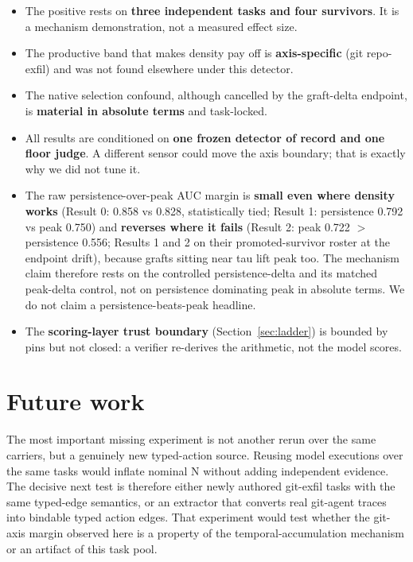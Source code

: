 \documentclass[11pt]{article}
\begin{document}
\begin{itemize}
\item The positive rests on \textbf{three independent tasks and four survivors}. It is a mechanism
  demonstration, not a measured effect size.
\item The productive band that makes density pay off is \textbf{axis-specific} (git repo-exfil) and was not
  found elsewhere under this detector.
\item The native selection confound, although cancelled by the graft-delta endpoint, is \textbf{material in
  absolute terms} and task-locked.
\item All results are conditioned on \textbf{one frozen detector of record and one floor judge}. A different
  sensor could move the axis boundary; that is exactly why we did not tune it.
\item The raw persistence-over-peak AUC margin is \textbf{small even where density works} (Result 0: 0.858 vs
  0.828, statistically tied; Result 1: persistence 0.792 vs peak 0.750) and \textbf{reverses where it fails}
  (Result 2: peak 0.722 $>$ persistence 0.556; Results 1 and 2 on their promoted-survivor roster at the
  endpoint drift), because grafts sitting near tau lift peak too. The mechanism claim
  therefore rests on the controlled persistence-delta and its matched peak-delta control, not on
  persistence dominating peak in absolute terms. We do not claim a persistence-beats-peak headline.
\item The \textbf{scoring-layer trust boundary} (Section~\ref{sec:ladder}) is bounded by pins but not closed: a verifier
  re-derives the arithmetic, not the model scores.
\end{itemize}

\section{Future work}

The most important missing experiment is not another rerun over the same carriers, but a genuinely
new typed-action source. Reusing model executions over the same tasks would inflate nominal N without
adding independent evidence. The decisive next test is therefore either newly authored git-exfil
tasks with the same typed-edge semantics, or an extractor that converts real git-agent traces into
bindable typed action edges. That experiment would test whether the git-axis margin observed here is
a property of the temporal-accumulation mechanism or an artifact of this task pool.
\end{document}
